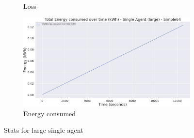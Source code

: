 \begin{figure}[h]
\begin{subfigure}[b]{0.495\textwidth}
        \caption{Loss}
    \end{subfigure}
    \begin{subfigure}[b]{0.495\textwidth}
        \includegraphics[width=1\textwidth]{figs/single_dqn_l_200/energy_consumed.png}
        \caption{Energy consumed}
    \end{subfigure}
    \caption{Stats for large single agent}
\end{figure}
